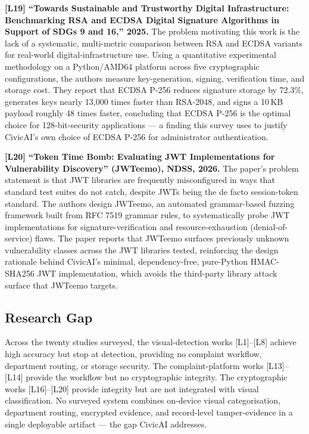 \documentclass[conference]{IEEEtran}
\begin{document}
\textbf{[L19] ``Towards Sustainable and Trustworthy Digital Infrastructure: Benchmarking RSA and ECDSA Digital Signature Algorithms in Support of SDGs 9 and 16,'' 2025.} The problem motivating this work is the lack of a systematic, multi-metric comparison between RSA and ECDSA variants for real-world digital-infrastructure use. Using a quantitative experimental methodology on a Python/AMD64 platform across five cryptographic configurations, the authors measure key-generation, signing, verification time, and storage cost. They report that ECDSA P-256 reduces signature storage by 72.3\%, generates keys nearly 13{,}000 times faster than RSA-2048, and signs a 10\,KB payload roughly 48 times faster, concluding that ECDSA P-256 is the optimal choice for 128-bit-security applications --- a finding this survey uses to justify CivicAI's own choice of ECDSA P-256 for administrator authentication.

\textbf{[L20] ``Token Time Bomb: Evaluating JWT Implementations for Vulnerability Discovery'' (JWTeemo), NDSS, 2026.} The paper's problem statement is that JWT libraries are frequently misconfigured in ways that standard test suites do not catch, despite JWTs being the de facto session-token standard. The authors design JWTeemo, an automated grammar-based fuzzing framework built from RFC 7519 grammar rules, to systematically probe JWT implementations for signature-verification and resource-exhaustion (denial-of-service) flaws. The paper reports that JWTeemo surfaces previously unknown vulnerability classes across the JWT libraries tested, reinforcing the design rationale behind CivicAI's minimal, dependency-free, pure-Python HMAC-SHA256 JWT implementation, which avoids the third-party library attack surface that JWTeemo targets.

\subsection{Research Gap}
Across the twenty studies surveyed, the visual-detection works [L1]--[L8] achieve high accuracy but stop at detection, providing no complaint workflow, department routing, or storage security. The complaint-platform works [L13]--[L14] provide the workflow but no cryptographic integrity. The cryptographic works [L16]--[L20] provide integrity but are not integrated with visual classification. No surveyed system combines on-device visual categorisation, department routing, encrypted evidence, and record-level tamper-evidence in a single deployable artifact --- the gap CivicAI addresses.
\end{document}
